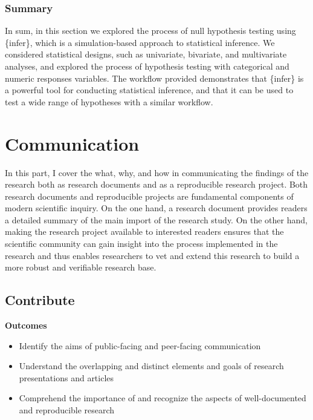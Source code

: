 \documentclass[
  letterpaper,
]{book}
\providecommand{\tightlist}{%
  \setlength{\itemsep}{0pt}\setlength{\parskip}{0pt}}\usepackage{longtable,booktabs,array}
\theoremstyle{definition}
\theoremstyle{remark}
\begin{document}
\section*{Summary}\label{summary-9}


In sum, in this section we explored the process of null hypothesis
testing using \{infer\}, which is a simulation-based approach to
statistical inference. We considered statistical designs, such as
univariate, bivariate, and multivariate analyses, and explored the
process of hypothesis testing with categorical and numeric responses
variables. The workflow provided demonstrates that \{infer\} is a
powerful tool for conducting statistical inference, and that it can be
used to test a wide range of hypotheses with a similar workflow.

\part{Communication}

In this part, I cover the what, why, and how in communicating the
findings of the research both as research documents and as a
reproducible research project. Both research documents and reproducible
projects are fundamental components of modern scientific inquiry. On the
one hand, a research document provides readers a detailed summary of the
main import of the research study. On the other hand, making the
research project available to interested readers ensures that the
scientific community can gain insight into the process implemented in
the research and thus enables researchers to vet and extend this
research to build a more robust and verifiable research base.

\chapter{Contribute}\label{sec-contribute-chapter}

\begin{tcolorbox}[enhanced jigsaw, breakable, colframe=quarto-callout-color-frame, toprule=.15mm, arc=.35mm, colback=white, left=2mm, bottomrule=.15mm, rightrule=.15mm, opacityback=0, leftrule=.75mm]

\textbf{ Outcomes}

\begin{itemize}
\tightlist
\item
  Identify the aims of public-facing and peer-facing communication
\item
  Understand the overlapping and distinct elements and goals of research
  presentations and articles
\item
  Comprehend the importance of and recognize the aspects of
  well-documented and reproducible research
\end{itemize}

\end{tcolorbox}
\end{document}
